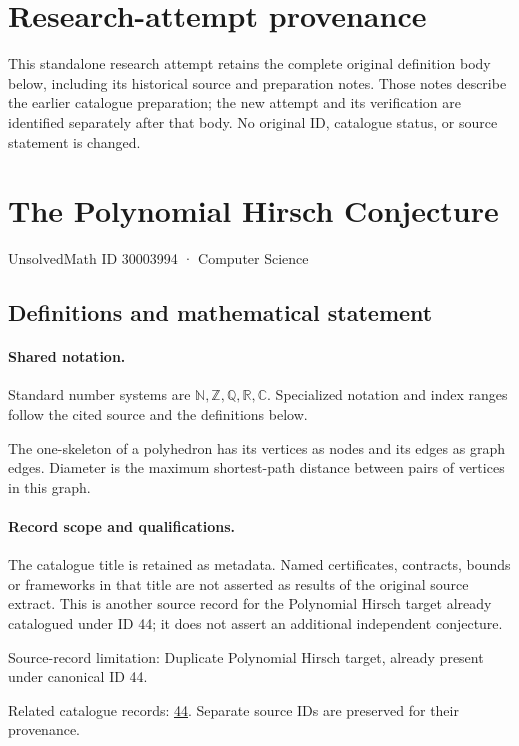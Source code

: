\documentclass[11pt]{article}
\begin{document}
\section*{Research-attempt provenance}
This standalone research attempt retains the complete original definition body below,
including its historical source and preparation notes. Those notes describe the
earlier catalogue preparation; the new attempt and its verification are identified
separately after that body. No original ID, catalogue status, or source statement is changed.

\section{The Polynomial Hirsch Conjecture}\label{30003994}
{\small UnsolvedMath ID 30003994 · Computer Science}
\subsection{Definitions and mathematical statement}

\paragraph{Shared notation.}Standard number systems are $\mathbb N,\mathbb Z,\mathbb Q,\mathbb R,\mathbb C$. Specialized notation and index ranges follow the cited source and the definitions below.


The one-skeleton of a polyhedron has its vertices as nodes and its edges as graph edges. Diameter is the maximum shortest-path distance between pairs of vertices in this graph.
\paragraph{Record scope and qualifications.}
The catalogue title is retained as metadata. Named certificates, contracts, bounds or frameworks in that title are not asserted as results of the original source extract.
This is another source record for the Polynomial Hirsch target already catalogued under ID 44; it does not assert an additional independent conjecture.

Source-record limitation: Duplicate Polynomial Hirsch target, already present under canonical ID 44.

Related catalogue records: \href{https://mehmetmars7.github.io/Erdosproblems-llm-hunter/problem.html?type=open_problems&id=44}{44}. Separate source IDs are preserved for their provenance.
\end{document}
